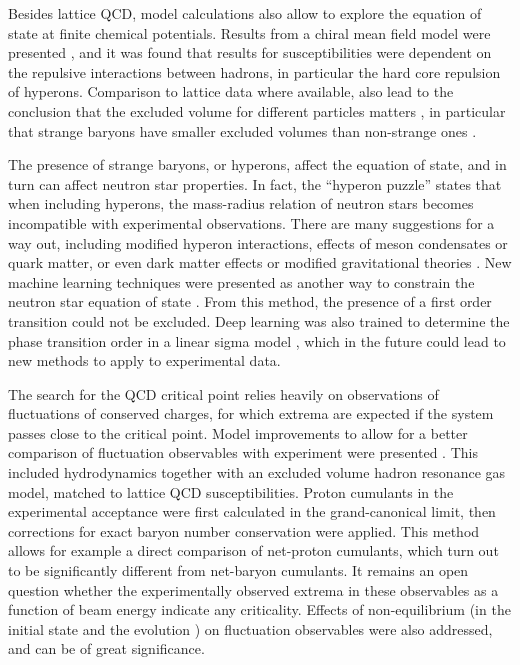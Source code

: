 \documentclass{webofc}
\begin{document}
Besides lattice QCD, model calculations also allow to explore the equation of state at finite chemical potentials. Results from a chiral mean field model were presented \cite{Motornenko:2020yme}, and it was found that results for susceptibilities were dependent on the repulsive interactions between hadrons, in particular the hard core repulsion of hyperons. Comparison to lattice data where available, also lead to the conclusion that the excluded volume for different particles matters \cite{Goswami:2020yez}, in particular that strange baryons have smaller excluded volumes than non-strange ones \cite{Motornenko:2020yme}. 

The presence of strange baryons, or hyperons, affect the equation of state, and in turn can affect neutron star properties. In fact, the ``hyperon puzzle'' states that when including hyperons, the mass-radius relation of neutron stars becomes incompatible with experimental observations. There are many suggestions for a way out, including modified hyperon interactions, effects of meson condensates or quark matter, or even dark matter effects or modified gravitational theories \cite{Tolos:2020aln}. New machine learning techniques were presented as another way to constrain the neutron star equation of state \cite{Fujimoto:2021zas}. From this method, the presence of a first order transition could not be excluded. Deep learning was also trained to determine the phase transition order in a linear sigma model \cite{Jiang:2021gsw}, which in the future could lead to new methods to apply to experimental data. 

The search for the QCD critical point relies heavily on observations of fluctuations of conserved charges, for which extrema are expected if the system passes close to the critical point. Model improvements to allow for a better comparison of fluctuation observables with experiment were presented \cite{Vovchenko:2021kxx}. This included hydrodynamics together with an excluded volume hadron resonance gas model, matched to lattice QCD susceptibilities. Proton cumulants in the experimental acceptance were first calculated in the grand-canonical limit, then corrections for exact baryon number conservation were applied. This method allows for example a direct comparison of net-proton cumulants, which turn out to be significantly different from net-baryon cumulants. It remains an open question whether the experimentally observed extrema in these observables as a function of beam energy indicate any criticality. Effects of non-equilibrium (in the initial state \cite{Dore:2020jye} and the evolution \cite{Kitazawa:2020kvc}) on fluctuation observables were also addressed, and can be of great significance. 
\end{document}
